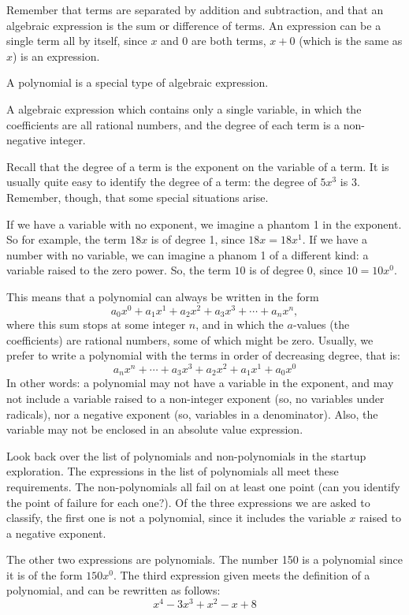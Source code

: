 Remember that terms are separated by addition and subtraction, and that an \gls{algebraic expression} is the sum or difference of terms. An expression can be a single term all by itself, since $x$ and $0$ are both terms, $x+0$ (which is the same as $x$) is an expression.

A \gls{polynomial} is a special type of algebraic expression.

\begin{boxeddef}[Polynomial]
A algebraic expression which contains only a single variable, in which the coefficients are all rational numbers, and the degree of each term is a non-negative integer.
\end{boxeddef}

Recall that the \gls{degree of a term} is the exponent on the variable of a term. It is usually quite easy to identify the degree of a term: the degree of $5x^3$ is 3. Remember, though, that some special situations arise.

If we have a variable with no exponent, we imagine a phantom 1 in the exponent. So for example, the term $18x$ is of degree 1, since $18x = 18x^1$. If we have a number with no variable, we can imagine a phanom 1 of a different kind: a variable raised to the zero power. So, the term $10$ is of degree 0, since $10 = 10x^0$.

This means that a polynomial can always be written in the form
\[a_0x^0 + a_1x^1 + a_2x^2 + a_3x^3+ \dotsb +a_nx^n,\]
where this sum stops at some integer $n$, and in which the $a$-values (the coefficients) are rational numbers, some of which might be zero. Usually, we prefer to write a polynomial with the terms in order of decreasing degree, that is:
\[a_nx^n + \dotsb + a_3x^3 + a_2x^2 + a_1x^1 + a_0x^0\]
In other words: a polynomial may not have a variable in the exponent, and may not include a variable raised to a non-integer exponent (so, no variables under radicals), nor a negative exponent (so, variables in a denominator). Also, the variable may not be enclosed in an absolute value expression.

Look back over the list of polynomials and non-polynomials in the startup exploration. The expressions in the list of polynomials all meet these requirements. The non-polynomials all fail on at least one point (can you identify the point of failure for each one?). Of the three expressions we are asked to classify, the first one is not a polynomial, since it includes the variable $x$ raised to a negative exponent. 

The other two expressions are polynomials. The number 150 is a polynomial since it is of the form $150x^0$. The third expression given meets the definition of a polynomial, and can be rewritten as follows:
\[x^4 - 3x^3 + x^2 - x + 8\]

